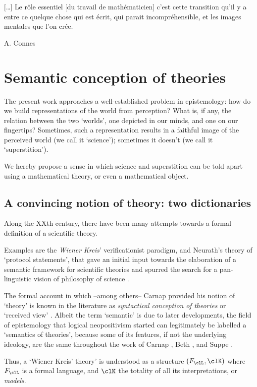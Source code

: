 \epigraph{[\dots\unkern] Le rôle essentiel [du travail de mathématicien] c'est cette transition qu'il y a entre ce quelque chose qui est écrit, qui parait incompréhensible, et les images mentales que l'on crée.}{A. Connes}
\section{Semantic conception of theories}\label{sec_1_intro}
The present work approaches a well-established problem in epistemology: how do we build representations of the world from perception? What is, if any, the relation between the two `worlds', one depicted in our minds, and one on our fingertips? Sometimes, such a representation results in a faithful image of the perceived world (we call it `science'); sometimes it doesn't (we call it `superstition').

We hereby propose a sense in which science and superstition can be told apart using a mathematical theory, or even a mathematical object.
\subsection{A convincing notion of theory: two dictionaries}
Along the XXth century, there have been many attempts towards a formal definition of a scientific theory.

Examples are the \emph{Wiener Kreis}' verificationist paradigm, and Neurath's theory of `protocol statements', that gave an initial input towards the elaboration of a semantic framework for scientific theories and spurred the search for a pan-linguistic vision of philosophy of science \cite{Weinb}.

The formal account in which --among others-- Carnap \cite{carnapfound} provided his notion of `theory' is known in the literature as \emph{syntactical conception of theories} or `received view' \cite{krause-foundation,krause2011axiomatization,giunti2016}. Albeit the term `semantic' is due to later developments, the field of epistemology that logical neopositivism started can legitimately be labelled a `semantics of theories', because some of its features, if not the underlying ideology, are the same throughout the work of Carnap \cite{carnap56,carnapfound},  Beth \cite{beth1961semantics}, and Suppe \cite{suppe89}.

Thus, a `Wiener Kreis' theory' is understood as a structure $(F_\clL, \clK)$ where $F_\clL$ is a formal language, and $\clK$ the totality of all its interpretations, or \emph{models}.

